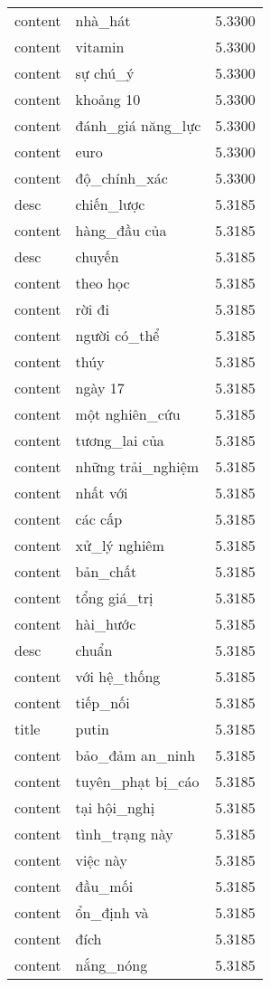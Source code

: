 \documentclass{article}
\begin{document}
\begin{tabular}{lll}
content & nhà\_hát & 5.3300\\
content & vitamin & 5.3300\\
content & sự chú\_ý & 5.3300\\
content & khoảng 10 & 5.3300\\
content & đánh\_giá năng\_lực & 5.3300\\
content & euro & 5.3300\\
content & độ\_chính\_xác & 5.3300\\
desc & chiến\_lược & 5.3185\\
content & hàng\_đầu của & 5.3185\\
desc & chuyến & 5.3185\\
content & theo học & 5.3185\\
content & rời đi & 5.3185\\
content & người có\_thể & 5.3185\\
content & thúy & 5.3185\\
content & ngày 17 & 5.3185\\
content & một nghiên\_cứu & 5.3185\\
content & tương\_lai của & 5.3185\\
content & những trải\_nghiệm & 5.3185\\
content & nhất với & 5.3185\\
content & các cấp & 5.3185\\
content & xử\_lý nghiêm & 5.3185\\
content & bản\_chất & 5.3185\\
content & tổng giá\_trị & 5.3185\\
content & hài\_hước & 5.3185\\
desc & chuẩn & 5.3185\\
content & với hệ\_thống & 5.3185\\
content & tiếp\_nối & 5.3185\\
title & putin & 5.3185\\
content & bảo\_đảm an\_ninh & 5.3185\\
content & tuyên\_phạt bị\_cáo & 5.3185\\
content & tại hội\_nghị & 5.3185\\
content & tình\_trạng này & 5.3185\\
content & việc này & 5.3185\\
content & đầu\_mối & 5.3185\\
content & ổn\_định và & 5.3185\\
content & đích & 5.3185\\
content & nắng\_nóng & 5.3185\\

\end{tabular}
\end{document}
